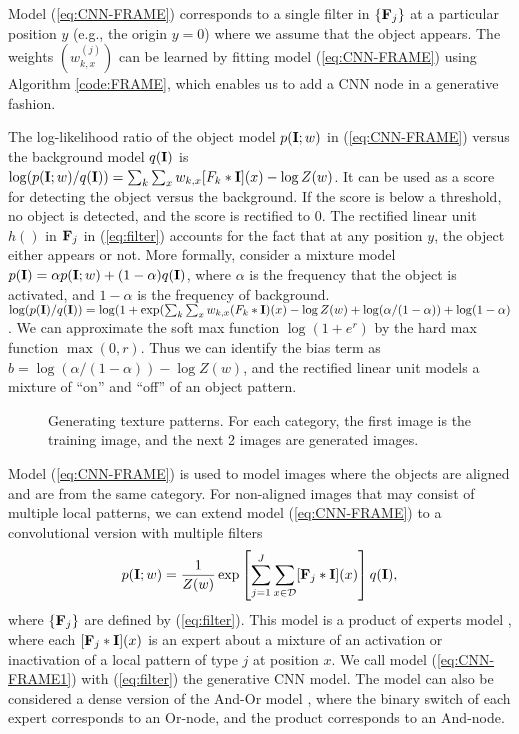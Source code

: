 \documentclass[letterpaper]{article}
\def\I{{\bf I}}
\def\F{{\bf F}}
\begin{document}
Model (\ref{eq:CNN-FRAME}) corresponds to a single filter in $\{\F_j\}$ at a particular position $y$ (e.g.,  the origin $y = 0$) where we assume that the object appears. The weights $(w^{(j)}_{k, x})$ can be learned by fitting model (\ref{eq:CNN-FRAME}) using Algorithm \ref{code:FRAME}, which enables us to add a CNN node in a generative fashion. 

The log-likelihood ratio of the object model $p(\I; w)$ in (\ref{eq:CNN-FRAME}) versus the  background model $q(\I)$ is $\log (p(\I; w)/q(\I))= \sum_{k} \sum_{x} w_{k, x} [F_k*\I](x) - \log Z(w)$. It  can be used as a score for detecting the object versus the background. If the score is below a threshold, no object is detected, and the score is rectified to 0.  The rectified linear unit $h()$ in $\F_j$ in (\ref{eq:filter}) accounts for the fact that at any position $y$, the object either appears or not. More formally, consider a mixture model $p(\I) = \alpha p(\I; w) + (1-\alpha) q(\I)$,  where $\alpha$ is the frequency that the object is activated, and $1-\alpha$ is the frequency of background. $\log (p(\I)/q(\I)) = \log (1+ \exp (\sum_{k} \sum_{x} w_{k, x} (F_k*\I)(x) - \log Z(w) + \log (\alpha/(1-\alpha)) + \log(1-\alpha)$. We can approximate the soft max function $\log (1+e^r)$ by the hard max function $\max(0, r)$. Thus we can identify the bias term as $b = \log(\alpha/(1-\alpha)) - \log Z(w)$, and the rectified linear unit models a mixture of ``on'' and ``off'' of an object pattern. 



\begin{figure}
	\centering
	\setlength{\fboxrule}{1pt}
	\setlength{\fboxsep}{0cm}	
	
	\caption{Generating texture patterns. For each category, the first image is the training image, and the next 2 images are generated images. }
	\label{fig:texture}
\end{figure}




Model (\ref{eq:CNN-FRAME}) is used to model images where the objects are aligned and are from the same category. For non-aligned images that may consist of multiple local patterns, we can extend model (\ref{eq:CNN-FRAME}) to a convolutional version with multiple filters
\begin{eqnarray}
   p(\I; w) = \frac{1}{Z(w)} \exp \left[\sum_{j=1}^{J} \sum_{x \in {\cal D}} [\F_j*\I](x)\right] q(\I), 
   \label{eq:CNN-FRAME1}
\end{eqnarray}
where $\{\F_j\}$ are defined by (\ref{eq:filter}). This model is a product of experts model \citep{Hinton2002a}, where each  $[\F_j*\I](x)$ is an expert about a mixture of an activation or inactivation of a local pattern of type $j$ at position $x$.  We call model (\ref{eq:CNN-FRAME1}) with (\ref{eq:filter}) the generative CNN model. The model can also be considered a dense version of the And-Or model \citep{ZhuM06}, where the binary switch of each expert corresponds to an Or-node, and the product corresponds to an And-node. 
\end{document}
